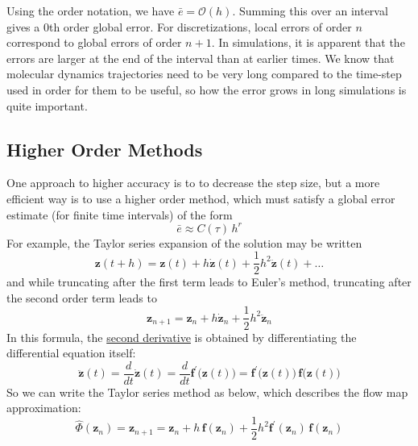     Using the order notation, we have $\bar{e} = \mathcal{O}(h)$. Summing this over an interval gives a $0$th order global error. For discretizations, local errors of order $n$ correspond to global errors of order $n+1$. In simulations, it is apparent that the errors are larger at the end of the interval than at earlier times. We know that molecular dynamics trajectories need to be very long compared to the time-step used in order for them to be useful, so how the error grows in long simulations is quite important. 

  \subsection{Higher Order Methods}

    One approach to higher accuracy is to to decrease the step size, but a more efficient way is to use a higher order method, which must satisfy a global error estimate (for finite time intervals) of the form 
    \begin{equation}
      \bar{e} \approx C(\tau) \, h ^r
    \end{equation}
    For example, the Taylor series expansion of the solution may be written 
    \begin{equation}
      \mathbf{z}(t + h) = \mathbf{z}(t) + h \boldsymbol{\dot{z}} (t) + \frac{1}{2} h^2 \boldsymbol{\ddot{z}}(t) + \ldots
    \end{equation}
    and while truncating after the first term leads to Euler's method, truncating after the second order term leads to 
    \begin{equation}
      \mathbf{z}_{n+1} = \mathbf{z}_n + h\boldsymbol{\dot{z}}_n + \frac{1}{2} h^2 \boldsymbol{\ddot{z}}_n
    \end{equation}
    In this formula, the \hyperref[mv-def:second-derivative]{second derivative} is obtained by differentiating the differential equation itself: 
    \begin{equation}
      \boldsymbol{\ddot{z}}(t) = \frac{d}{dt} \boldsymbol{\dot{z}}(t) = \frac{d}{dt} \mathbf{f}^\prime \big( \mathbf{z}(t)\big) = \mathbf{f}^\prime\big( \mathbf{z}(t)\big) \, \mathbf{f}\big(\mathbf{z}(t)\big)
    \end{equation}
    So we can write the Taylor series method as below, which describes the flow map approximation: 
    \begin{equation}
      \hat{\Phi} (\mathbf{z}_{n}) = \mathbf{z}_{n+1} = \mathbf{z}_n + h\, \mathbf{f}(\mathbf{z}_n) + \frac{1}{2} h^2 \mathbf{f}^\prime (\mathbf{z}_n) \, \mathbf{f}(\mathbf{z}_n)
    \end{equation}

